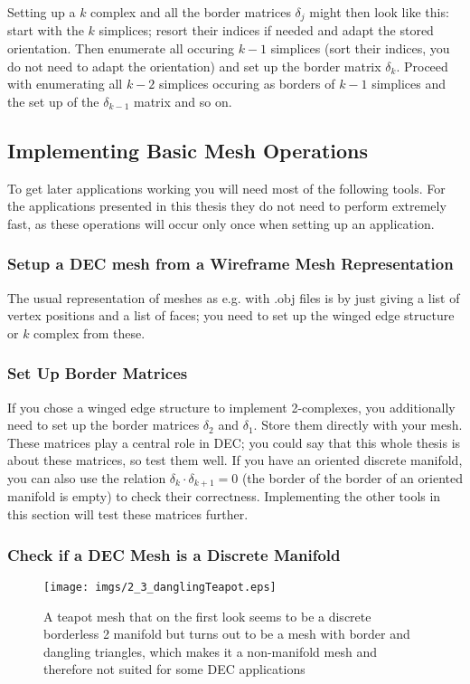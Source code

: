 Setting up a $k$ complex  and all the border matrices $\delta_j$ might then look like this: start with the $k$ simplices; resort their indices if needed and adapt the stored orientation.
Then enumerate all occuring $k-1$ simplices (sort their indices, you do not need to adapt the orientation) and set up the border matrix $\delta_k$. Proceed with enumerating all $k-2$ simplices occuring as borders of $k-1$ simplices and the set up of the $\delta_{k-1}$ matrix and so on.

		
\subsection{Implementing Basic Mesh Operations}
To get later applications working you will need most of the following tools. For the applications presented in this thesis they do not need to perform extremely fast, as these operations will occur only once when setting up an application.

\subsubsection{Setup a DEC mesh from a Wireframe Mesh Representation}
The usual representation of meshes as e.g. with .obj files is by just giving a list of vertex positions and a list of faces; you need to set up the winged edge structure or $k$ complex from these.
	
\subsubsection{Set Up Border Matrices}
If you chose a winged edge structure to implement 2-complexes, you additionally need to set up the border matrices $\delta_2$ and $\delta_1$. Store them directly with your mesh. These matrices play a central role in DEC; you could say that this whole thesis is about these matrices, so test them well. If you have an oriented discrete manifold, you can also use the relation $\delta_{k}\cdot \delta_{k+1} = 0$ (the border of the border of an oriented manifold is empty) to check their correctness. Implementing the other tools in this section will test these matrices further.

\subsubsection{Check if a DEC Mesh is a Discrete Manifold}
\begin{figure}[tb]
	\begin{center}
	\texttt{[image: imgs/2\_3\_danglingTeapot.eps]}
	\end{center}
	\caption{A teapot mesh that on the first look seems to be a discrete borderless 2 manifold but turns out to be a mesh with border and dangling triangles, which makes it a non-manifold mesh and therefore not suited for some DEC applications}
\end{figure}

